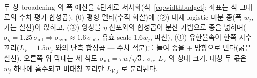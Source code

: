 \caption{두-상 broadening 의 폭 예산을 4단계로 서사화(식~\eqref{eq:widthbudget}; 좌표는 식 그대로의 수치
평가$\cdot$합성곱). (0) 평형 델타(수직 화살)에 (②) 내재 logistic 미분 종(폭 $w_j$, 가는 실선)이 얹히고, (③)
앙상블 $\eta$ 산포와의 합성곱이 분산 가법으로 종을 넓히며($\sigma_\eta{=}1.25\,\sigma_\mathrm{int}\Rightarrow
\sigma_\mathrm{sym}\approx1.6\,\sigma_\mathrm{int}$, 유효 scale $1.6w_j$, 파선), (①) 유한율속이 한쪽 지수
꼬리($L_V{=}1.5w_j$ 와의 단측 합성곱 --- 수치 적분)를 늘여 종을 $+$ 방향으로 민다(굵은 실선). 오른쪽 위 막대는
세 척도 $\sigma_\mathrm{int}\!=\!\pi w/\sqrt3$, $\sigma_\eta$, $L_V$ 의 상대 크기. 대칭 두 몫은 $w_j$ 하나에
흡수되고 비대칭 꼬리만 $L_{V,j}$ 로 분리된다.}
\label{fig:widthbudget}
